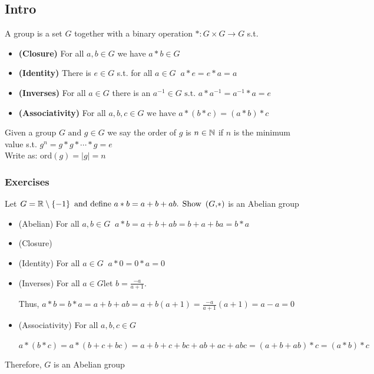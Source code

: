 \subsection{Intro}
\begin{definition}
    A group is a set \(G\) together with a binary operation \(*:G\times G\to G\) s.t.
    \begin{itemize}
        \item \textbf{(Closure)} For all \(a,b\in G\) we have \(a*b\in G\)
        \item \textbf{(Identity)} There is \(e \in G\) s.t. for all \(a \in G\;\; a*e=e*a=a\)
        \item \textbf{(Inverses)} For all \(a \in G\) there is an \(a^{-1}\in G \text{ s.t. } a*a^{-1}=a^{-1}*a=e\)
        \item \textbf{(Associativity)} For all \(a,b,c\in G \text{ we have } a*(b*c)=(a*b)*c\)
    \end{itemize}
\end{definition}

\begin{definition}
    Given a group \(G \text{ and } g\in G\) we say the order of \(g\) is \(n \in\mathbb{N}\) if \(n\) is the minimum value s.t. \(g^n=g*g*\cdots*g=e\) \\
    Write as: ord\(\left( g \right)=\mid g \mid=n\)
\end{definition}

\subsubsection{Exercises}
\begin{example}
    Let \(G =\mathbb{R}\setminus\left\{ -1 \right\} \text{ and define } a * b = a+b+ab \text{. Show } \left( G\text{,}* \right)\) is an Abelian group
    \begin{itemize}
        \item (Abelian) For all \(a,b\in G\;\; a*b=a+b+ab=b+a+ba=b*a\)
        \item (Closure) \checkmark
        \item (Identity) For all \(a \in G\;\; a*0=0*a=0\)
        \item (Inverses) For all \(a \in G\)\s\s let \s\s\(b= \displaystyle \frac{-a}{a+1}\). 
        
        \hspace{11pt} Thus, \(a*b=b*a=a+b+ab=a+b(a+1)=\displaystyle\frac{-a}{a+1}(a+1)=a-a=0\)
        \item (Associativity) For all \(a,b,c \in G\)
        
        \hspace{11pt} \(a*(b*c)=a*(b+c+bc)=a+b+c+bc+ab+ac+abc=(a+b+ab)*c=(a*b)*c\)
    \end{itemize}
    Therefore, \(G\) is an Abelian group
\end{example}

